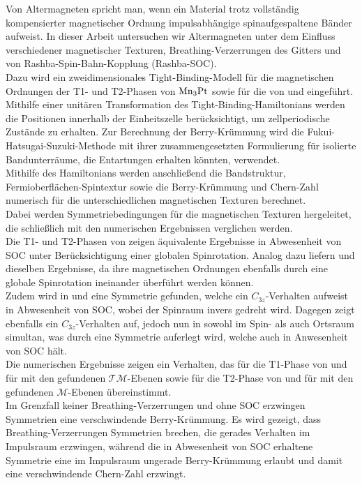 
Von Altermagneten spricht man, wenn ein Material trotz vollständig kompensierter magnetischer Ordnung impulsabhängige spinaufgespaltene Bänder aufweist.
In dieser Arbeit untersuchen wir Altermagneten unter dem Einfluss verschiedener magnetischer Texturen, Breathing-Verzerrungen des Gitters und von Rashba-Spin-Bahn-Kopplung (Rashba-SOC).\\

Dazu wird ein zweidimensionales Tight-Binding-Modell für die magnetischen Ordnungen der T1- und T2-Phasen von $\ce{Mn3Pt}$ sowie für die von  und  eingeführt. Mithilfe einer unitären Transformation des Tight-Binding-Hamiltonians werden die Positionen innerhalb der Einheitszelle berücksichtigt, um zellperiodische Zustände zu erhalten. Zur Berechnung der Berry-Krümmung wird die Fukui-Hatsugai-Suzuki-Methode mit ihrer zusammengesetzten Formulierung für isolierte Bandunterräume, die Entartungen erhalten könnten, verwendet.\\
Mithilfe des Hamiltonians werden anschließend die Bandstruktur, Fermioberflächen-Spintextur sowie die Berry-Krümmung und Chern-Zahl numerisch für die unterschiedlichen magnetischen Texturen berechnet.\\
Dabei werden Symmetriebedingungen für die magnetischen Texturen hergeleitet, die schließlich mit den numerischen Ergebnissen verglichen werden.\\

Die T1- und T2-Phasen von  zeigen äquivalente Ergebnisse in Abwesenheit von SOC unter Berücksichtigung einer globalen Spinrotation. Analog dazu liefern  und  dieselben Ergebnisse, da ihre magnetischen Ordnungen ebenfalls durch eine globale Spinrotation ineinander überführt werden können.\\
Zudem wird in  und  eine Symmetrie gefunden, welche ein $C_{3z}$-Verhalten aufweist in Abwesenheit von SOC, wobei der Spinraum invers gedreht wird. Dagegen zeigt  ebenfalls ein $C_{3z}$-Verhalten auf, jedoch nun in sowohl im Spin- als auch Ortsraum simultan, was durch eine Symmetrie auferlegt wird, welche auch in Anwesenheit von SOC hält.\\
Die numerischen Ergebnisse zeigen ein Verhalten, das für die T1-Phase von  und für  mit den gefundenen $\mathcal{TM}$-Ebenen sowie für die T2-Phase von  und für  mit den gefundenen $\mathcal{M}$-Ebenen übereinstimmt.\\
Im Grenzfall keiner Breathing-Verzerrungen und ohne SOC erzwingen Symmetrien eine verschwindende Berry-Krümmung.
Es wird gezeigt, dass Breathing-Verzerrungen Symmetrien brechen, die gerades Verhalten im Impulsraum erzwingen, während die in Abwesenheit von SOC erhaltene Symmetrie eine im Impulsraum ungerade Berry-Krümmung erlaubt und damit eine verschwindende Chern-Zahl erzwingt.\\

